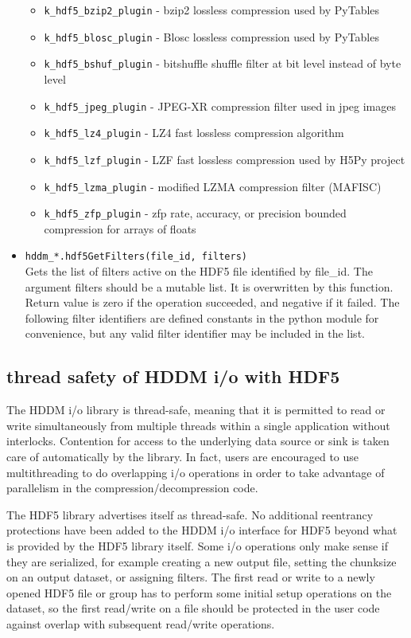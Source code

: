 \documentclass{revtex4}
\begin{document}
\begin{itemize}
\begin{itemize}
\item \texttt{k\_hdf5\_bzip2\_plugin} - bzip2 lossless compression used by PyTables
\item \texttt{k\_hdf5\_blosc\_plugin} - Blosc lossless compression used by PyTables
\item \texttt{k\_hdf5\_bshuf\_plugin} - bitshuffle shuffle filter at bit level instead of byte level
\item \texttt{k\_hdf5\_jpeg\_plugin} - JPEG-XR compression filter used in jpeg images
\item \texttt{k\_hdf5\_lz4\_plugin} - LZ4 fast lossless compression algorithm
\item \texttt{k\_hdf5\_lzf\_plugin} - LZF fast lossless compression used by H5Py project
\item \texttt{k\_hdf5\_lzma\_plugin} - modified LZMA compression filter (MAFISC)
\item \texttt{k\_hdf5\_zfp\_plugin} - zfp rate, accuracy, or precision bounded compression for arrays of floats
\end{itemize}
\item \texttt{hddm\_*.hdf5GetFilters(file\_id, filters)}\\
Gets the list of filters active on the HDF5 file identified by file\_id. The 
argument filters should be a mutable list. It is overwritten by this function.
Return value is zero if the operation succeeded, and negative if it failed.
The following filter identifiers are defined constants in the python module for
convenience, but any valid filter identifier may be included in the list.
\end{itemize}

\subsection{thread safety of HDDM i/o with HDF5}

The HDDM i/o library is thread-safe, meaning that it is permitted to read
or write simultaneously from multiple threads within a single application
without interlocks. Contention for access to the underlying data source or
sink is taken care of automatically by the library. In fact, users are
encouraged to use multithreading to do overlapping i/o operations in order
to take advantage of parallelism in the compression/decompression code.

The HDF5 library advertises itself as thread-safe. No additional reentrancy
protections have been added to the HDDM i/o interface for HDF5 beyond what is
provided by the HDF5 library itself. Some i/o operations only make sense if
they are serialized, for example creating a new output file, setting the
chunksize on an output dataset, or assigning filters. The first read or write
to a newly opened HDF5 file or group has to perform some initial setup
operations on the dataset, so the first read/write on a file should be
protected in the user code against overlap with subsequent read/write
operations.
\end{document}
